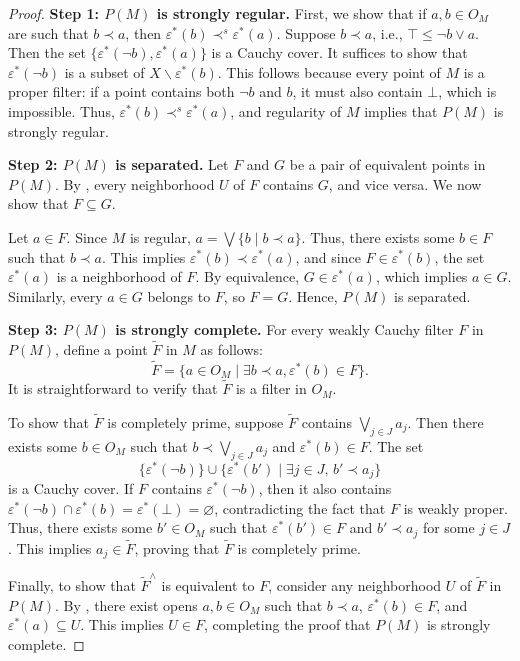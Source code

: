 \documentclass[reqno]{amsart}
\theoremstyle{definition}
\theoremstyle{remark}
\numberwithin{figure}{section}
\newcommand{\rb}{\prec}
\begin{document}
\begin{proof}
\textbf{Step 1: $P(M)$ is strongly regular.}
First, we show that if $a,b \in O_M$ are such that $b \rb a$, then $\varepsilon^*(b) \rb^s \varepsilon^*(a)$.
Suppose $b \rb a$, i.e., $\top \leq \neg b \vee a$.
Then the set $\{ \varepsilon^*(\neg b), \varepsilon^*(a) \}$ is a Cauchy cover.
It suffices to show that $\varepsilon^*(\neg b)$ is a subset of $X \backslash \varepsilon^*(b)$.
This follows because every point of $M$ is a proper filter: if a point contains both $\neg b$ and $b$, it must also contain $\bot$, which is impossible.
Thus, $\varepsilon^*(b) \rb^s \varepsilon^*(a)$, and regularity of $M$ implies that $P(M)$ is strongly regular.

\textbf{Step 2: $P(M)$ is separated.}
Let $F$ and $G$ be a pair of equivalent points in $P(M)$.
By , every neighborhood $U$ of $F$ contains $G$, and vice versa.
We now show that $F \subseteq G$.

Let $a \in F$.
Since $M$ is regular, $a = \bigvee \{ b \mid b \rb a \}$.
Thus, there exists some $b \in F$ such that $b \rb a$.
This implies $\varepsilon^*(b) \rb \varepsilon^*(a)$, and since $F \in \varepsilon^*(b)$, the set $\varepsilon^*(a)$ is a neighborhood of $F$.
By equivalence, $G \in \varepsilon^*(a)$, which implies $a \in G$.
Similarly, every $a \in G$ belongs to $F$, so $F = G$.
Hence, $P(M)$ is separated.

\textbf{Step 3: $P(M)$ is strongly complete.}
For every weakly Cauchy filter $F$ in $P(M)$, define a point $\widetilde{F}$ in $M$ as follows:
\[
\widetilde{F} = \{ a \in O_M \mid \exists b \rb a, \varepsilon^*(b) \in F \}.
\]
It is straightforward to verify that $\widetilde{F}$ is a filter in $O_M$.

To show that $\widetilde{F}$ is completely prime, suppose $\widetilde{F}$ contains $\bigvee_{j \in J} a_j$.
Then there exists some $b \in O_M$ such that $b \rb \bigvee_{j \in J} a_j$ and $\varepsilon^*(b) \in F$.
The set 
\[
\{ \varepsilon^*(\neg b) \} \cup \{ \varepsilon^*(b') \mid \exists j \in J, \, b' \rb a_j \}
\]
is a Cauchy cover.
If $F$ contains $\varepsilon^*(\neg b)$, then it also contains
$\varepsilon^*(\neg b) \cap \varepsilon^*(b) = \varepsilon^*(\bot) = \varnothing$,
contradicting the fact that $F$ is weakly proper.
Thus, there exists some $b' \in O_M$ such that $\varepsilon^*(b') \in F$ and $b' \rb a_j$ for some $j \in J$.
This implies $a_j \in \widetilde{F}$, proving that $\widetilde{F}$ is completely prime.

Finally, to show that $\widetilde{F}^\wedge$ is equivalent to $F$, consider any neighborhood $U$ of $\widetilde{F}$ in $P(M)$.
By , there exist opens $a,b \in O_M$ such that $b \rb a$, $\varepsilon^*(b) \in F$, and $\varepsilon^*(a) \subseteq U$.
This implies $U \in F$, completing the proof that $P(M)$ is strongly complete.
\end{proof}
\end{document}
